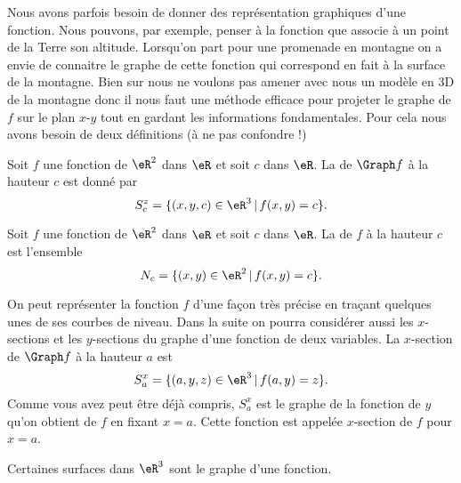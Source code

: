 Nous avons parfois besoin de donner des représentation graphiques d'une fonction. Nous pouvons, par exemple, penser à la fonction que associe à un point de la Terre son altitude. Lorsqu'on part pour une promenade en montagne on a envie de connaitre le graphe de cette fonction qui correspond en fait à la surface de la montagne. Bien sur nous ne voulons pas amener avec nous un modèle en 3D de la montagne donc il nous faut une méthode efficace pour projeter le graphe de $f$ sur le plan $x$-$y$ tout en gardant les informations fondamentales. Pour cela nous avons besoin de deux définitions (à ne pas confondre !)
\begin{definition}
	Soit $f$ une fonction de $\eR^2$ dans $\eR$ et soit $c$ dans $\eR$.  La  de $\Graph f$ à la hauteur $c$ est donné par
\[
S^z_c=\{ (x,y,c)\in \eR^3\,|\, f(x,y)=c\}.
\]  
\end{definition}
\begin{definition}\label{def_niveau}
	Soit $f$ une fonction de $\eR^2$ dans $\eR$ et soit $c$ dans $\eR$. La  de $f$ à la hauteur $c$ est l'ensemble
\[
N_c=\{ (x,y)\in \eR^2\,|\, f(x,y)=c\}.
\]  
\end{definition}
On peut représenter la fonction $f$ d'une façon très précise en traçant quelques unes de ses courbes de niveau.  Dans la suite on pourra considérer aussi les $x$-sections et les $y$-sections du graphe d'une fonction de deux variables. La $x$-section de $\Graph f$ à la hauteur $a$ est     
\[
S^x_a=\{(a,y,z)\in\eR^3\,|\, f(a,y)=z\}.
\]
Comme vous avez peut être déjà compris, $S^x_a$ est le graphe de la fonction de $y$ qu'on obtient de $f$ en fixant $x=a$. Cette fonction est appelée $x$-section de $f$ pour $x=a$.

Certaines surfaces dans $\eR^3$ sont le graphe d'une fonction. 

